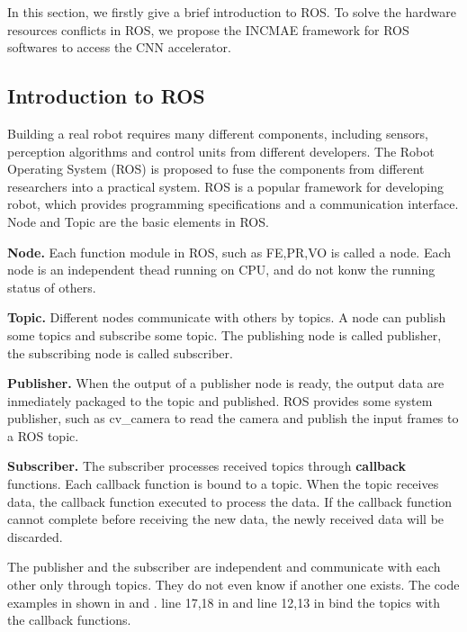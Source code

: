 \label{sec:incame}

In this section, we firstly give a brief introduction to ROS\cite{quigley2009ros}. To solve the hardware resources conflicts in ROS, we propose the INCMAE framework for ROS softwares to access the CNN accelerator.




\subsection{Introduction to ROS}
Building a real robot requires many different components, including sensors, perception algorithms and control units from different developers. The Robot Operating System (ROS) \cite{quigley2009ros} is proposed to fuse the components from different researchers into a practical system. ROS is a popular framework for developing robot, which provides programming specifications and a communication interface. Node and Topic are the basic elements in ROS.

\textbf{Node.} Each function module in ROS, such as FE,PR,VO is called a node. Each node is an independent thead running on CPU, and  do not konw the running status of others.

\textbf{Topic.} Different nodes communicate with others by topics. A node can publish some topics and subscribe some topic. The publishing node is called publisher, the subscribing node is called subscriber.

\textbf{Publisher.} When the output of a publisher node is ready, the output data are inmediately packaged to the topic and published. ROS provides some system publisher, such as cv\_camera \cite{cvcamera} to read the camera and publish the input frames to a ROS topic.

\textbf{Subscriber.} The subscriber processes received topics through \textbf{callback} functions. Each callback function is bound to a topic. When the topic receives data, the callback function executed to process the data. If the callback function cannot complete before receiving the new data, the newly received data will be discarded.

The publisher and the subscriber are independent and communicate with each other only through topics. They do not even know if another one exists. 
The code examples in shown in  and . line 17,18 in  and line 12,13 in  bind the topics with the callback functions.



